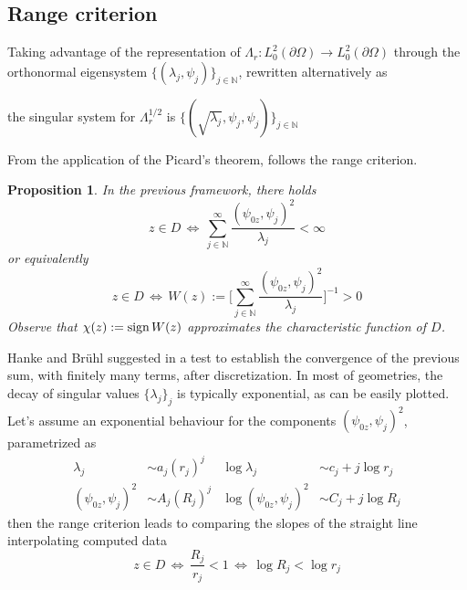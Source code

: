 \documentclass[10pt, a4paper, twoside, openright]{book}
\theoremstyle{definition}
\theoremstyle{plain}
\theoremstyle{plain}
\theoremstyle{plain}
\newtheorem{proposition}[subsection]{Proposition}
\theoremstyle{plain}
\theoremstyle{plain}
\theoremstyle{plain}
\theoremstyle{plain}
\theoremstyle{plain}
\begin{document}
\subsection{Range criterion}
Taking advantage of the representation of $\Lambda_r:L^2_0(\partial \Omega)\to L^2_0(\partial \Omega)$ through the orthonormal eigensystem $\bigl\{(\lambda_j, \psi_j)\bigr\}_{j\in\mathbb{N}}$, rewritten alternatively as
\begin{center}
the singular system for $\Lambda_r^{1/2}$ is $\bigl\{(\sqrt{\lambda_j}, \psi_j, \psi_j)\bigr\}_{j\in\mathbb{N}}$ 
\end{center}
From the application of the Picard's theorem, follows the range criterion.
\begin{proposition}
 In the previous framework, there holds
 \begin{equation}
  z \in D \, \Longleftrightarrow \, \sum_{j \in \mathbb{N}}^{\infty}\frac{(\psi_{0z}, \psi_j)^2}{\lambda_j} < \infty
 \end{equation}
 or equivalently
 \begin{equation}
  z \in D \, \Longleftrightarrow \, W(z):=\Bigg[\sum_{j \in \mathbb{N}}^{\infty}\frac{(\psi_{0z}, \psi_j)^2}{\lambda_j}\Bigg]^{-1} > 0
 \end{equation}
Observe that $\chi(z):=\textup{sign}\,W(z)$ approximates the characteristic function of $D$.
\end{proposition}
Hanke and Br\"{u}hl suggested in \cite{hanke-bruhl:recent} a test to establish the convergence of the previous sum, with finitely many terms, after discretization. In most of geometries, the decay of singular values $\bigl\{\lambda_j\bigr\}_j$ is typically exponential, as can be easily plotted. 
Let's assume an exponential behaviour for the components $(\psi_{0z},\psi_j )^2$, parametrized as
\begin{align}
 \lambda_j &\sim a_j (r_j) ^j  & \log\lambda_j &\sim c_j + j\log r_j\\
 (\psi_{0z}, \psi_j)^2 &\sim A_j(R_j)^j & \log(\psi_{0z}, \psi_j)^2 &\sim C_j + j\log R_j
\end{align}
then the range criterion leads to comparing the slopes of the straight line interpolating computed data
\begin{equation}
 z\in D \,\Longleftrightarrow\, \dfrac{R_j}{r_j} < 1 \,\Longleftrightarrow\, \log R_j < \log r_j
\end{equation}
\end{document}
